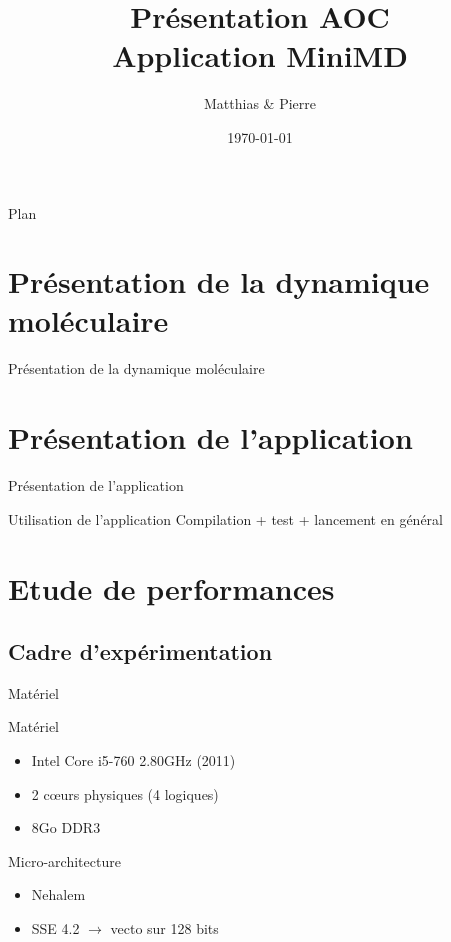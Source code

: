 \documentclass[9.5pt]{beamer}
\title[MPNA : MIS]{Présentation AOC \\Application MiniMD}
\author[\bsc{Beaupère} \& \bsc{Granger}]{Matthias \bsc{Beaupère} \& Pierre \bsc{Granger}}
\institute{M2 CHPS}
\date{\today}
\begin{document}

\begin{frame}
  \titlepage
\end{frame}

\begin{frame}{Plan}
	\tableofcontents[hideallsubsections]
\end{frame}

\section{Présentation de la dynamique moléculaire}
	\begin{frame}{Présentation de la dynamique moléculaire}
	\end{frame}

\section{Présentation de l'application}
	\begin{frame}{Présentation de l'application}
	\end{frame}

	\begin{frame}{Utilisation de l'application}
		Compilation + test + lancement en général
	\end{frame}

\section{Etude de performances}
	\subsection{Cadre d'expérimentation}
		\begin{frame}{Matériel}
			\begin{block}{Matériel}
				\begin{itemize}
					\item Intel Core i5-760 2.80GHz (2011)
					\item 2 c\oe{}urs physiques (4 logiques)
					\item 8Go DDR3
				\end{itemize}
			\end{block}

			\begin{block}{Micro-architecture}
				\begin{itemize}
					\item Nehalem
					\item SSE 4.2 $\rightarrow$ vecto sur 128 bits
				\end{itemize}
			\end{block}
		\end{frame}
\end{document}
